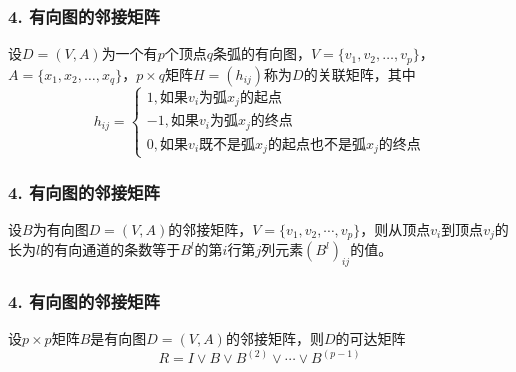 \documentclass{beamer}
\begin{document}
\begin{CJK*}{UTF8}{gbsn}
\begin{frame}
  \frametitle{4. 有向图的邻接矩阵}
  \centering
  \begin{Def}\justifying\let\raggedright\justifying
   设$D=(V,A)$为一个有$p$个顶点$q$条弧的有向图，$V=\{v_1,v_2,\ldots, v_p\}$，$A=\{x_1,x_2,\ldots,x_q\}$，$p\times q$矩阵$H=(h_{ij})$称为$D$的关联矩阵，其中
  \[h_{ij}=\begin{cases}
      1, \text{如果}v_i\text{为弧}x_j\text{的起点}\\
      -1, \text{如果}v_i\text{为弧}x_j\text{的终点}\\
      0, \text{如果}v_i\text{既不是弧}x_j\text{的起点也不是弧}x_j\text{的终点}
    \end{cases}
  \]
 \end{Def}
\end{frame}

\begin{frame}
  \frametitle{4. 有向图的邻接矩阵}
  \begin{Thm}
   设$B$为有向图$D=(V,A)$的邻接矩阵，$V=\{v_1,v_2,\cdots,v_p\}$，则从顶点$v_i$到顶点$v_j$的长为$l$的有向通道的条数等于$B^l$的第$i$行第$j$列元素$(B^l)_{ij}$的值。 
  \end{Thm}
\end{frame}

\begin{frame}
  \frametitle{4. 有向图的邻接矩阵}
  \begin{Thm}
    设$p \times p$矩阵$B$是有向图$D=(V,A)$的邻接矩阵，则$D$的可达矩阵
    \[R = I \lor B \lor B^{(2)} \lor \cdots \lor B^{(p-1)}\]
  \end{Thm}
\end{frame}


\end{CJK*}
\end{document}

